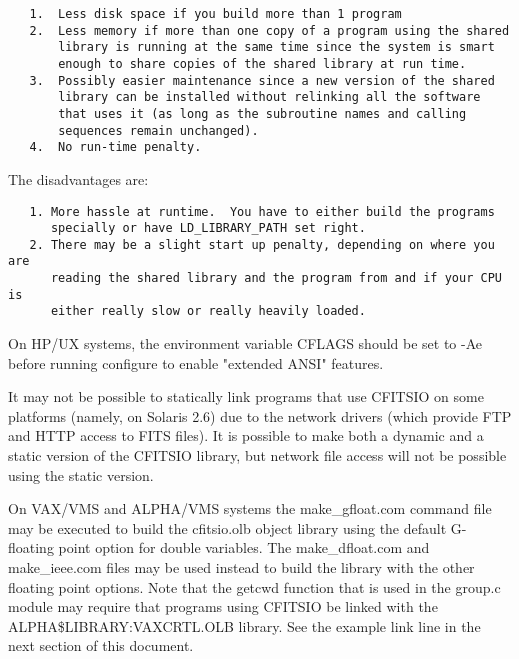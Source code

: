 \documentclass[11pt]{book}
\begin{document}
\begin{verbatim}
   1.  Less disk space if you build more than 1 program
   2.  Less memory if more than one copy of a program using the shared
       library is running at the same time since the system is smart
       enough to share copies of the shared library at run time.
   3.  Possibly easier maintenance since a new version of the shared
       library can be installed without relinking all the software
       that uses it (as long as the subroutine names and calling
       sequences remain unchanged).
   4.  No run-time penalty.
\end{verbatim}
The disadvantages are:

\begin{verbatim}
   1. More hassle at runtime.  You have to either build the programs
      specially or have LD_LIBRARY_PATH set right.
   2. There may be a slight start up penalty, depending on where you are
      reading the shared library and the program from and if your CPU is
      either really slow or really heavily loaded.
\end{verbatim}

On HP/UX systems, the environment variable CFLAGS should be set
to -Ae before running configure to enable "extended ANSI" features.

It may not be possible to statically link programs that use CFITSIO on
some platforms (namely, on Solaris 2.6) due to the network drivers
(which provide FTP and HTTP access to FITS files).  It is possible to
make both a dynamic and a static version of the CFITSIO library, but
network file access will not be possible using the static version.

On VAX/VMS and ALPHA/VMS systems the make\_gfloat.com command file may
be executed to build the cfitsio.olb object library using the default
G-floating point option for double variables.  The make\_dfloat.com and
make\_ieee.com files may be used instead to build the library with the
other floating point options. Note that the getcwd function that is
used in the group.c module may require that programs using CFITSIO be
linked with the ALPHA\$LIBRARY:VAXCRTL.OLB library.  See the example
link line in the next section of this document.
\end{document}
